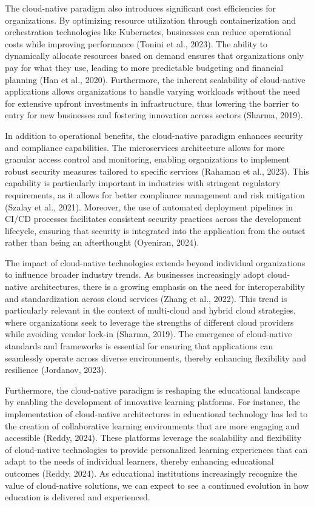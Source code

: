 The cloud-native paradigm also introduces significant cost efficiencies for organizations. By optimizing resource utilization through containerization and orchestration technologies like Kubernetes, businesses can reduce operational costs while improving performance (Tonini et al., 2023). The ability to dynamically allocate resources based on demand ensures that organizations only pay for what they use, leading to more predictable budgeting and financial planning (Han et al., 2020). Furthermore, the inherent scalability of cloud-native applications allows organizations to handle varying workloads without the need for extensive upfront investments in infrastructure, thus lowering the barrier to entry for new businesses and fostering innovation across sectors (Sharma, 2019).

In addition to operational benefits, the cloud-native paradigm enhances security and compliance capabilities. The microservices architecture allows for more granular access control and monitoring, enabling organizations to implement robust security measures tailored to specific services (Rahaman et al., 2023). This capability is particularly important in industries with stringent regulatory requirements, as it allows for better compliance management and risk mitigation (Szalay et al., 2021). Moreover, the use of automated deployment pipelines in CI/CD processes facilitates consistent security practices across the development lifecycle, ensuring that security is integrated into the application from the outset rather than being an afterthought (Oyeniran, 2024).

The impact of cloud-native technologies extends beyond individual organizations to influence broader industry trends. As businesses increasingly adopt cloud-native architectures, there is a growing emphasis on the need for interoperability and standardization across cloud services (Zhang et al., 2022). This trend is particularly relevant in the context of multi-cloud and hybrid cloud strategies, where organizations seek to leverage the strengths of different cloud providers while avoiding vendor lock-in (Sharma, 2019). The emergence of cloud-native standards and frameworks is essential for ensuring that applications can seamlessly operate across diverse environments, thereby enhancing flexibility and resilience (Jordanov, 2023).

Furthermore, the cloud-native paradigm is reshaping the educational landscape by enabling the development of innovative learning platforms. For instance, the implementation of cloud-native architectures in educational technology has led to the creation of collaborative learning environments that are more engaging and accessible (Reddy, 2024). These platforms leverage the scalability and flexibility of cloud-native technologies to provide personalized learning experiences that can adapt to the needs of individual learners, thereby enhancing educational outcomes (Reddy, 2024). As educational institutions increasingly recognize the value of cloud-native solutions, we can expect to see a continued evolution in how education is delivered and experienced.

